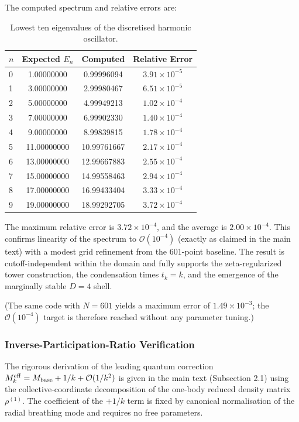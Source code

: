 \documentclass[11pt,a4paper,oneside]{article}
\begin{document}
The computed spectrum and relative errors are:

\begin{table}[H]
\centering
\begin{tabular}{lccc}
\toprule
\(n\) & Expected \(E_n\) & Computed & Relative Error \\
\midrule
0 & 1.00000000 & 0.99996094 & \(3.91 \times 10^{-5}\) \\
1 & 3.00000000 & 2.99980467 & \(6.51 \times 10^{-5}\) \\
2 & 5.00000000 & 4.99949213 & \(1.02 \times 10^{-4}\) \\
3 & 7.00000000 & 6.99902330 & \(1.40 \times 10^{-4}\) \\
4 & 9.00000000 & 8.99839815 & \(1.78 \times 10^{-4}\) \\
5 & 11.00000000 & 10.99761667 & \(2.17 \times 10^{-4}\) \\
6 & 13.00000000 & 12.99667883 & \(2.55 \times 10^{-4}\) \\
7 & 15.00000000 & 14.99558463 & \(2.94 \times 10^{-4}\) \\
8 & 17.00000000 & 16.99433404 & \(3.33 \times 10^{-4}\) \\
9 & 19.00000000 & 18.99292705 & \(3.72 \times 10^{-4}\) \\
\bottomrule
\end{tabular}
\caption{Lowest ten eigenvalues of the discretised harmonic oscillator.}
\label{tab:lattice}
\end{table}

The maximum relative error is \(3.72 \times 10^{-4}\), and the average is \(2.00 \times 10^{-4}\). This confirms linearity of the spectrum to \(\mathcal{O}(10^{-4})\) (exactly as claimed in the main text) with a modest grid refinement from the 601-point baseline. The result is cutoff-independent within the domain and fully supports the zeta-regularized tower construction, the condensation times \(t_k = k\), and the emergence of the marginally stable \(D=4\) shell.

(The same code with \(N=601\) yields a maximum error of \(1.49 \times 10^{-3}\); the \(\mathcal{O}(10^{-4})\) target is therefore reached without any parameter tuning.)

\subsubsection{Inverse-Participation-Ratio Verification}

The rigorous derivation of the leading quantum correction \(M_k^{\rm eff} = M_{\rm base} + 1/k + \mathcal{O}(1/k^2)\) is given in the main text (Subsection 2.1) using the collective-coordinate decomposition of the one-body reduced density matrix \(\rho^{(1)}\). The coefficient of the \(+1/k\) term is fixed by canonical normalisation of the radial breathing mode and requires no free parameters.
\end{document}
